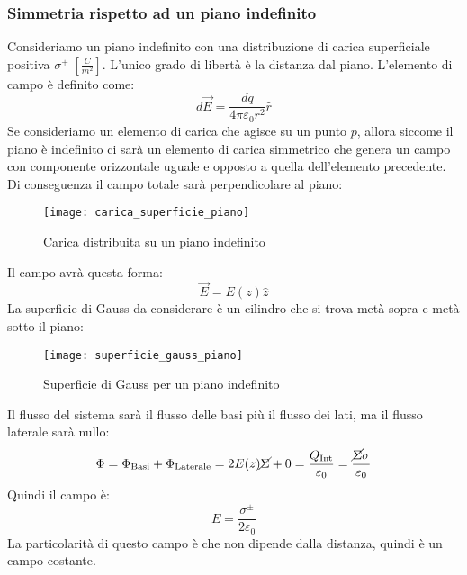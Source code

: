 \documentclass[a4paper]{article}
\begin{document}
\subsubsection{Simmetria rispetto ad un piano indefinito}
Consideriamo un piano indefinito con una distribuzione di carica superficiale 
positiva \( \sigma^+ \; \left[ \frac{C}{m^2} \right] \). L'unico grado di libertà
è la distanza dal piano. L'elemento di campo è definito come:
\[
  d\vec{E} = \frac{dq}{4 \pi \varepsilon_0 r^2} \hat{r}
\] 
Se consideriamo un elemento di carica che agisce su un punto \( p \), allora siccome
il piano è indefinito ci sarà un elemento di carica simmetrico che genera un campo
con componente orizzontale uguale e opposto a quella dell'elemento precedente.
Di conseguenza il campo totale sarà perpendicolare al piano:
\begin{figure}[H]
  \centering
  \texttt{[image: carica\_superficie\_piano]}
  \caption{Carica distribuita su un piano indefinito}
\end{figure}
\noindent
Il campo avrà questa forma:
\[
  \vec{E} = E(z) \hat{z}
\] 
La superficie di Gauss da considerare è un cilindro che si trova metà sopra e metà sotto
il piano:
\begin{figure}[H]
  \centering
  \texttt{[image: superficie\_gauss\_piano]}
  \caption{Superficie di Gauss per un piano indefinito}
\end{figure}
\noindent
Il flusso del sistema sarà il flusso delle basi più il flusso dei lati, ma il flusso
laterale sarà nullo:
\[
  \Phi = \Phi_{\text{Basi}} + \Phi_{\text{Laterale}} = 2 E(z) \cancel{\Sigma} + 0 
  = \frac{Q_{\text{Int}}}{\varepsilon_0} = \frac{\cancel{\Sigma} \sigma}{\varepsilon_0}
\] 
Quindi il campo è:
\[
  E = \frac{\sigma^\pm}{2 \varepsilon_0}
\] 
La particolarità di questo campo è che non dipende dalla distanza, quindi è un campo
costante.
\end{document}
